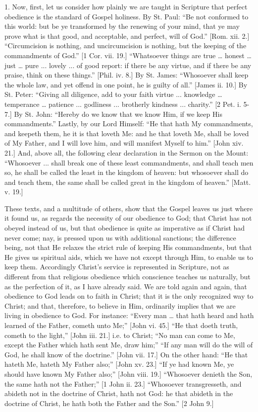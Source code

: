 1. Now, first, let us consider how plainly we are taught in
Scripture that perfect obedience is the standard of Gospel holiness.
By St. Paul: ``Be not conformed to this world: but be ye
transformed by the renewing of your mind, that ye may prove what is
that good, and acceptable, and perfect, will of God.'' [Rom. xii.
2.] ``Circumcision is nothing, and uncircumcision is nothing, but
the keeping of the commandments of God.'' [1 Cor. vii. 19.]
``Whatsoever things are true … honest … just … pure ...
lovely ... of good report: if there be any virtue, and if there be any
praise, think on these things.'' [Phil. iv. 8.] By St. James:
``Whosoever shall keep the whole law, and yet offend in one point,
he is guilty of all.'' [James ii. 10.] By St. Peter: ``Giving
all diligence, add to your faith virtue ... knowledge … temperance
… patience ... godliness ... brotherly kindness ... charity.''
[2 Pet. i. 5-7.] By St. John: ``Hereby do we know that we know
Him, if we keep His commandments.'' Lastly, by our Lord Himself:
``He that hath My commandments, and keepeth them, he it is that
loveth Me: and he that loveth Me, shall be loved of My Father, and I
will love him, and will manifest Myself to him.'' [John xiv. 21.]
And, above all, the following clear declaration in the Sermon on the
Mount: ``Whosoever ... shall break one of these least
commandments, and shall teach men so, he shall be called the least in
the kingdom of heaven: but whosoever shall do and teach them, the same
shall be called great in the kingdom of heaven.'' [Matt. v. 19.]

These texts, and a multitude of others, show that the Gospel leaves
us just where it found us, as regards the necessity of our obedience
to God; that Christ has not obeyed instead of us, but that obedience
is quite as imperative as if Christ had never come; nay, is pressed
upon us with additional sanctions; the difference being, not that He
relaxes the strict rule of keeping His commandments, but that He gives
us spiritual aids, which we have not except through Him, to enable us
to keep them. Accordingly Christ's service is represented in
Scripture, not as different from that religious obedience which
conscience teaches us naturally, but as the perfection of it, as I
have already said. We are told again and again, that obedience to God
leads on to faith in Christ; that it is the only recognized way to
Christ; and that, therefore, to believe in Him, ordinarily implies
that we are living in obedience to God. For instance: ``Every man
… that hath heard and hath learned of the Father, cometh unto
Me;'' [John vi. 45.] ``He that doeth truth, cometh to the
light,'' [John iii. 21.] i.e. to Christ; ``No man can come to
Me, except the Father which hath sent Me, draw him;'' ``If any
man will do the will of God, he shall know of the doctrine.''
[John vii. 17.] On the other hand: ``He that hateth Me, hateth My
Father also;'' [John xv. 23.] ``If ye had known Me, ye should
have known My Father also;'' [John viii. 19.] ``Whosoever
denieth the Son, the same hath not the Father;'' [1 John ii. 23.]
``Whosoever transgresseth, and abideth not in the doctrine of
Christ, hath not God: he that abideth in the doctrine of Christ, he
hath both the Father and the Son.'' [2 John 9.]

